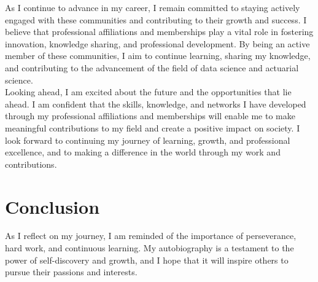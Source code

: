 \documentclass[12pt,a4paper,sans,english]{report}
\begin{document}
\noindent As I continue to advance in my career, I remain committed to staying actively engaged with these communities and contributing to their growth and success. I believe that professional affiliations and memberships play a vital role in fostering innovation, knowledge sharing, and professional development. By being an active member of these communities, I aim to continue learning, sharing my knowledge, and contributing to the advancement of the field of data science and actuarial science.\\

\noindent Looking ahead, I am excited about the future and the opportunities that lie ahead. I am confident that the skills, knowledge, and networks I have developed through my professional affiliations and memberships will enable me to make meaningful contributions to my field and create a positive impact on society. I look forward to continuing my journey of learning, growth, and professional excellence, and to making a difference in the world through my work and contributions.



	
	\chapter{Conclusion}
	
	As I reflect on my journey, I am reminded of the importance of perseverance, hard work, and continuous learning. My autobiography is a testament to the power of self-discovery and growth, and I hope that it will inspire others to pursue their passions and interests.
	
	
	
\end{document}
